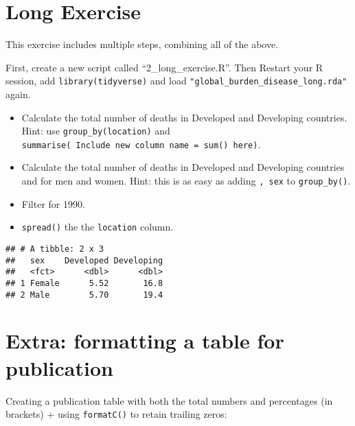 \documentclass[]{book}
\providecommand{\tightlist}{%
  \setlength{\itemsep}{0pt}\setlength{\parskip}{0pt}}
\theoremstyle{definition}
\theoremstyle{definition}
\theoremstyle{definition}
\theoremstyle{remark}
\begin{document}
\newpage 

\section{Long Exercise}\label{long-exercise}

This exercise includes multiple steps, combining all of the above.

First, create a new script called ``2\_long\_exercise.R''. Then Restart
your R session, add \texttt{library(tidyverse)} and load
\texttt{"global\_burden\_disease\_long.rda"} again.

\begin{itemize}
\tightlist
\item
  Calculate the total number of deaths in Developed and Developing
  countries. Hint: use \texttt{group\_by(location)} and
  \texttt{summarise(\ Include\ new\ column\ name\ =\ sum()\ here)}.
\item
  Calculate the total number of deaths in Developed and Developing
  countries and for men and women. Hint: this is as easy as adding
  \texttt{,\ sex} to \texttt{group\_by()}.
\item
  Filter for 1990.
\item
  \texttt{spread()} the the \texttt{location} column.
\end{itemize}

\begin{verbatim}
## # A tibble: 2 x 3
##   sex    Developed Developing
##   <fct>      <dbl>      <dbl>
## 1 Female      5.52       16.8
## 2 Male        5.70       19.4
\end{verbatim}

\section{Extra: formatting a table for
publication}\label{extra-formatting-a-table-for-publication}

Creating a publication table with both the total numbers and percentages
(in brackets) + using \texttt{formatC()} to retain trailing zeros:
\end{document}
